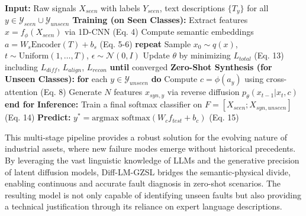 \begin{algorithm}
\caption{Diff-LM-GZSL: Training and Inference}
\begin{algorithmic}[1]
\State \textbf{Input:} Raw signals $X_{seen}$ with labels $Y_{seen}$, text descriptions $\{T_y\}$ for all $y \in \mathcal{Y}_{seen} \cup \mathcal{Y}_{unseen}$
\State \textbf{Training (on Seen Classes):}
\State \quad Extract features $x = f_\phi(X_{seen})$ via 1D-CNN (Eq. 4)
\State \quad Compute semantic embeddings $a = W_s \text{Encoder}(T) + b_s$ (Eq. 5-6)
\State \quad \textbf{repeat}
\State \quad \quad Sample $x_0 \sim q(x)$, $t \sim \text{Uniform}(1, \dots, T)$, $\epsilon \sim \mathcal{N}(0, I)$
\State \quad \quad Update $\theta$ by minimizing $L_{total}$ (Eq. 13) including $L_{diff}$, $L_{align}$, $L_{recon}$
\State \quad \textbf{until} converged
\State \textbf{Zero-Shot Synthesis (for Unseen Classes):}
\State \quad \textbf{for} each $y \in \mathcal{Y}_{unseen}$ \textbf{do}
\State \quad \quad Compute $c = \phi(a_y)$ using cross-attention (Eq. 8)
\State \quad \quad Generate $N$ features $x_{syn, y}$ via reverse diffusion $p_\theta(x_{t-1}|x_t, c)$
\State \quad \textbf{end for}
\State \textbf{Inference:}
\State \quad Train a final softmax classifier on $F = [X_{seen}; X_{syn, unseen}]$ (Eq. 14)
\State \quad \textbf{Predict:} $y^* = \text{argmax } \text{softmax}(W_c f_{test} + b_c)$ (Eq. 15)
\end{algorithmic}
\end{algorithm}

This multi-stage pipeline provides a robust solution for the evolving nature of industrial assets, where new failure modes emerge without historical precedents. By leveraging the vast linguistic knowledge of LLMs and the generative precision of latent diffusion models, Diff-LM-GZSL bridges the semantic-physical divide, enabling continuous and accurate fault diagnosis in zero-shot scenarios. The resulting model is not only capable of identifying unseen faults but also providing a technical justification through its reliance on expert language descriptions.